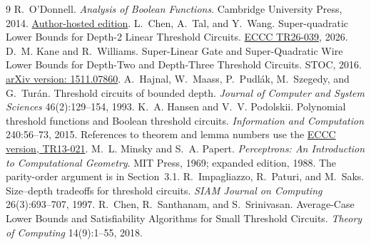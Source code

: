\documentclass[11pt]{article}
\begin{document}
\begin{thebibliography}{9}\small
{} R.~O'Donnell. \emph{Analysis of Boolean Functions}.
Cambridge University Press, 2014.
\href{https://www.cs.cmu.edu/~odonnell/papers/Analysis-of-Boolean-Functions-by-Ryan-ODonnell.pdf}{Author-hosted edition}.
 L.~Chen, A.~Tal, and Y.~Wang.
Super-quadratic Lower Bounds for Depth-2 Linear Threshold Circuits.
\href{https://eccc.weizmann.ac.il/report/2026/039/}{ECCC TR26-039}, 2026.
 D.~M. Kane and R.~Williams.
Super-Linear Gate and Super-Quadratic Wire Lower Bounds for Depth-Two and
Depth-Three Threshold Circuits. STOC, 2016.
\href{https://arxiv.org/abs/1511.07860}{arXiv version: 1511.07860}.
 A.~Hajnal, W.~Maass, P.~Pudl\'ak, M.~Szegedy, and G.~Tur\'an.
Threshold circuits of bounded depth.
\emph{Journal of Computer and System Sciences} 46(2):129--154, 1993.
 K.~A. Hansen and V.~V. Podolskii.
Polynomial threshold functions and Boolean threshold circuits.
\emph{Information and Computation} 240:56--73, 2015.
References to theorem and lemma numbers use the
\href{https://eccc.weizmann.ac.il/report/2013/021/download/}{ECCC version, TR13-021}.
 M.~L. Minsky and S.~A. Papert.
\emph{Perceptrons: An Introduction to Computational Geometry}.
MIT Press, 1969; expanded edition, 1988. The parity-order argument is in
Section~3.1.
 R.~Impagliazzo, R.~Paturi, and M.~Saks.
Size--depth tradeoffs for threshold circuits.
\emph{SIAM Journal on Computing} 26(3):693--707, 1997.
 R.~Chen, R.~Santhanam, and S.~Srinivasan.
Average-Case Lower Bounds and Satisfiability Algorithms for Small Threshold
Circuits. \emph{Theory of Computing} 14(9):1--55, 2018.
\end{thebibliography}
\end{document}
